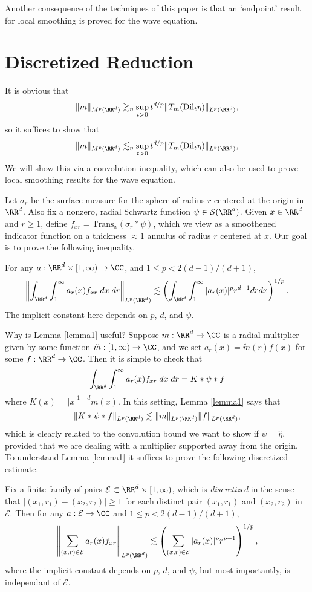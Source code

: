 Another consequence of the techniques of this paper is that an `endpoint' result for local smoothing is proved for the wave equation.

\section{Discretized Reduction}

It is obvious that
%
\[ \| m \|_{M^p(\RR^d)} \gtrsim_\eta \sup_{t > 0} t^{d/p} \| T_m(\text{Dil}_t \eta) \|_{L^p(\RR^d)}, \]
%
so it suffices to show that
%
\[ \| m \|_{M^p(\RR^d)} \lesssim_\eta \sup_{t > 0} t^{d/p} \| T_m(\text{Dil}_t \eta) \|_{L^p(\RR^d)}, \]
%
We will show this via a convolution inequality, which can also be used to prove local smoothing results for the wave equation.

Let $\sigma_r$ be the surface measure for the sphere of radius $r$ centered at the origin in $\RR^d$. Also fix a nonzero, radial Schwartz function $\psi \in \mathcal{S}(\RR^d)$. Given $x \in \RR^d$ and $r \geq 1$, define $f_{x r} = \text{Trans}_x (\sigma_r * \psi)$, which we view as a smoothened indicator function on a thickness $\approx 1$ annulus of radius $r$ centered at $x$. Our goal is to prove the following inequality.

\begin{lemma} \label{lemma1}
    For any $a : \RR^d \times [1,\infty) \to \CC$, and $1 \leq p < 2(d-1)/(d+1)$,
    \[ \left\| \int_{\RR^d} \int_1^\infty a_r(x) f_{x r}\; dx\; dr \right\|_{L^p(\RR^d)} \lesssim \left( \int_{\RR^d} \int_1^\infty |a_r(x)|^p r^{d-1} dr dx \right)^{1/p}. \]
    The implicit constant here depends on $p$, $d$, and $\psi$.
\end{lemma}

Why is Lemma \ref{lemma1} useful? Suppose $m: \RR^d \to \CC$ is a radial multiplier given by some function $\tilde{m}: [1,\infty) \to \CC$, and we set $a_r(x) = \tilde{m}(r) f(x)$ for some $f: \RR^d \to \CC$. Then it is simple to check that
%
\[ \int_{\RR^d} \int_1^\infty a_r(x) f_{x r}\; dx\; dr = K * \psi * f \]
%
where $K(x) = |x|^{1-d} m(x)$. In this setting, Lemma \ref{lemma1} says that
%
\[ \| K * \psi * f \|_{L^p(\RR^d)} \lesssim \| m \|_{L^p(\RR^d)} \| f \|_{L^p(\RR^d)}, \]
%
which is clearly related to the convolution bound we want to show if $\psi = \widehat{\eta}$, provided that we are dealing with a multiplier supported away from the origin. To understand Lemma \ref{lemma1} it suffices to prove the following discretized estimate.

\begin{theorem} \label{lemma2}
    Fix a finite family of pairs $\mathcal{E} \subset \RR^d \times [1,\infty)$, which is \emph{discretized} in the sense that $|(x_1,r_1) - (x_2,r_2)| \geq 1$ for each distinct pair $(x_1,r_1)$ and $(x_2,r_2)$ in $\mathcal{E}$. Then for any $a: \mathcal{E} \to \CC$ and $1 \leq p < 2(d - 1)/(d+1)$, 
    \[ \left\| \sum_{(x,r) \in \mathcal{E}} a_r(x) f_{x r} \right\|_{L^p(\RR^d)} \lesssim \left( \sum_{(x,r) \in \mathcal{E}} |a_r(x)|^p r^{p-1} \right)^{1/p}, \]
    where the implicit constant depends on $p$, $d$, and $\psi$, but most importantly, is independant of $\mathcal{E}$.
\end{theorem}

